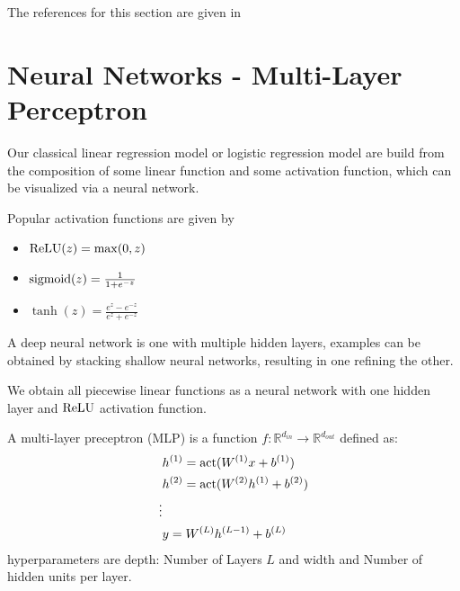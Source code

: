 \documentclass[12 pt]{article}        	%
\begin{document}
The references for this section are given in
\begin{center}
    \cite[ch. 17.1, 17.3]{pml1Book}
    \cite[ch. 7.1.0 - 7.1.2]{Pattern_recognition_machine_learning}
\end{center}


\section{Neural Networks - Multi-Layer Perceptron}

Our classical linear regression model or logistic regression model are build from the composition of some linear function and some activation function, which can be visualized via a neural network.

Popular activation functions are given by 

\begin{itemize}
    \item 
    $ \operatorname{ReLU} ( z ) = \max ( 0 , z ) $

    \item 
    $ \operatorname{sigmoid} ( z ) = \frac{ 1 }{ 1 + e^{ - z } }$

    \item 
    $ \tanh ( z ) = \frac{ e^z - e^{ - z } }{ e^z + e^{ - z } } $
\end{itemize}

A deep neural network is one with multiple hidden layers, examples can be obtained by stacking shallow neural networks, resulting in one refining the other.

\begin{lem}
    We obtain all piecewise linear functions as a neural network with one hidden layer and $ \operatorname{ReLU} $ activation function.
\end{lem}

\begin{defi}
    A multi-layer preceptron (MLP) is a function $ f \colon \mathbb{ R }^{ d_{ in } } \to \mathbb{ R }^{ d_{ out } } $ defined as:
    \begin{align*}
        &h^{ ( 1 ) } = \operatorname{act} ( W^{ ( 1 ) } x + b^{ ( 1 ) } )
        \\
        &h^{ ( 2 ) } = \operatorname{act} ( W^{ ( 2 ) } h^{ ( 1 ) } + b^{ ( 2 ) } )
        \\
        \vdots
        \\
        &y = W^{ ( L ) } h^{ ( L - 1 ) } + b^{ ( L ) }
    \end{align*}
    hyperparameters are depth: Number of Layers $ L $ and width and Number of hidden units per layer.
\end{defi}
\end{document}
